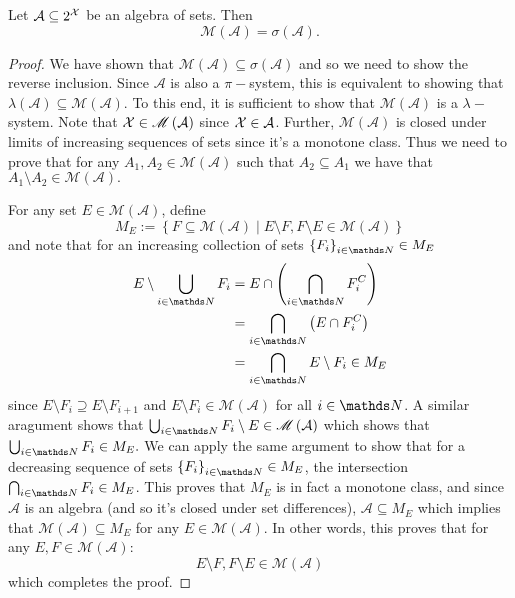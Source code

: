 \begin{thm}
\label{thm:monotoneClassThm} Let $\mathcal{A}\subseteq2^{\mathcal{X}}$ be
an algebra of sets. Then
\[
\mathscr{M}\left(\mathcal{A}\right)=\sigma\left(\mathcal{A}\right).
\]
\end{thm}

\begin{proof}
We have shown that $\mathscr{M}\left(\mathcal{A}\right)\subseteq\sigma\left(\mathcal{A}\right)$
and so we need to show the reverse inclusion. Since $\mathcal{A}$
is also a $\pi-$system, this is equivalent to showing that $\lambda\left(\mathcal{A}\right)\subseteq\mathscr{M}\left(\mathcal{A}\right)$.
To this end, it is sufficient to show that $\mathscr{M}\left(\mathcal{A}\right)$
is a $\lambda-$system. Note that $\mathcal{X}\in\mathscr{M}\left(\mathcal{A}\right)$
since $\mathcal{X}\in\mathcal{A}$. Further, $\mathscr{M}\left(\mathcal{A}\right)$
is closed under limits of increasing sequences of sets since it's
a monotone class. Thus we need to prove that for any $A_{1},A_{2}\in\mathscr{M}\left(\mathcal{A}\right)$
such that $A_{2}\subseteq A_{1}$ we have that $A_{1}\setminus A_{2}\in\mathscr{M}\mathcal{\left(A\right)}.$

For any set $E\in\mathscr{M}\left(\mathcal{A}\right)$, define
\[
M_{E}:=\left\{ F\subseteq\mathscr{M}\left(\mathcal{A}\right)\mid E\setminus F,F\setminus E\in\mathscr{M}\left(\mathcal{A}\right)\right\} 
\]
and note that for an increasing collection of sets $\left\{ F_{i}\right\} _{i\in\N}\in M_{E}$
\begin{align*}
E\setminus\bigcup_{i\in\N}F_{i} & =E\cap\left(\bigcap_{i\in\N}F_{i}^{C}\right)\\
 & =\bigcap_{i\in\N}\left(E\cap F_{i}^{C}\right)\\
 & =\bigcap_{i\in\N}E\setminus F_{i}\in M_{E}
\end{align*}
since $E\setminus F_{i}\supseteq E\setminus F_{i+1}$ and $E\setminus F_{i}\in\mathscr{M}\left(\mathcal{A}\right)$
for all $i\in\N$. A similar aragument shows that $\bigcup_{i\in\N}F_{i}\setminus E\in\mathscr{M}\left(\mathcal{A}\right)$
which shows that $\bigcup_{i\in\N}F_{i}\in M_{E}.$ We can apply the
same argument to show that for a decreasing sequence of sets $\left\{ F_{i}\right\} _{i\in\N}\in M_{E}$,
the intersection $\bigcap_{i\in\N}F_{i}\in M_{E}$. This proves that
$M_{E}$ is in fact a monotone class, and since $\mathcal{A}$ is
an algebra (and so it's closed under set differences), $\mathcal{A}\subseteq M_{E}$
which implies that $\mathscr{M}\left(\mathcal{A}\right)\subseteq M_{E}$
for any $E\in\mathscr{M}\left(\mathcal{A}\right).$ In other words,
this proves that for any $E,F\in\mathscr{M}\left(\mathcal{A}\right):$
\[
E\setminus F,F\setminus E\in\mathscr{M}\left(\mathcal{A}\right)
\]
 which completes the proof.
\end{proof}
